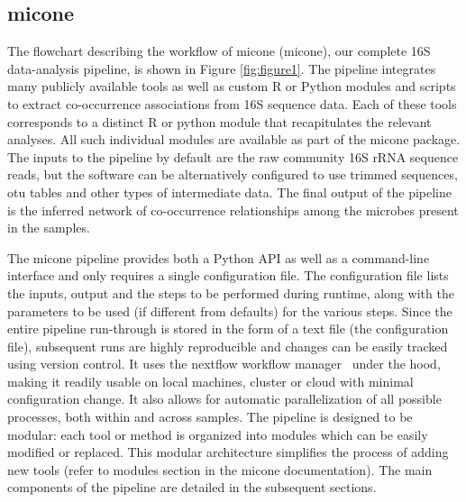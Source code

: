   \subsection*{\ac{micone}}

  \vspace{-5mm}
  The flowchart describing the workflow of \ac{micone} (\acl{micone}), our complete 16S data-analysis pipeline, is shown in Figure \ref{fig:figure1}.
  The pipeline integrates many publicly available tools as well as custom R or Python modules and scripts to extract co-occurrence associations from 16S sequence data.
  Each of these tools corresponds to a distinct R or python module that recapitulates the relevant analyses.
  All such individual modules are available as part of the \ac{micone} package.
  The inputs to the pipeline by default are the raw community 16S rRNA sequence reads, but the software can be alternatively configured to use trimmed sequences, \ac{otu} tables and other types of intermediate data.
  The final output of the pipeline is the inferred network of co-occurrence relationships among the microbes present in the samples.

  The \ac{micone} pipeline provides both a Python API as well as a command-line interface and only requires a single configuration file.
  The configuration file lists the inputs, output and the steps to be performed during runtime, along with the parameters to be used (if different from defaults) for the various steps.
  Since the entire pipeline run-through is stored in the form of a text file (the configuration file), subsequent runs are highly reproducible and changes can be easily tracked using version control.
  It uses the nextflow workflow manager~\cite{Tommaso2015} under the hood, making it readily usable on local machines, cluster or cloud with minimal configuration change.
  It also allows for automatic parallelization of all possible processes, both within and across samples.
  The pipeline is designed to be modular: each tool or method is organized into modules which can be easily modified or replaced.
  This modular architecture simplifies the process of adding new tools (refer to modules section in the \ac{micone} documentation).
  The main components of the pipeline are detailed in the subsequent sections.

